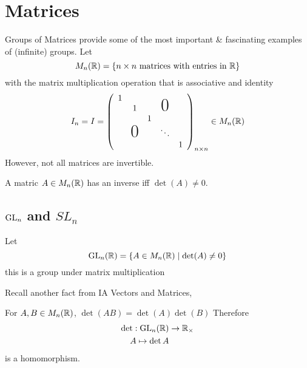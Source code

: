 \documentclass{article}
\begin{document}
\section{Matrices}

Groups of Matrices provide some of the most important \& fascinating examples of (infinite) groups.
Let
\[
    M_n(\mathbb{R}) = \{ n \times n \text{ matrices with entries in } \mathbb{R}\}
\]
with the matrix multiplication operation that is associative and identity
\[
    I_n = I = \bkt{
        \begin{array}{ccccc}
            1                                                    \\
              & 1                     &  & \smash{\text{\huge0}} \\
              &                       & 1                        \\
              & \smash{\text{\huge0}} &   & \ddots               \\
              &                       &   &   & 1
        \end{array}
    }_{n \times n} \in M_n(\R)
\]
However, not all matrices are invertible.
\begin{lemma}
    A matric $A \in M_n(\mathbb{R})$ has an inverse iff $\det(A) \neq 0$.
\end{lemma}
\subsection{$\mathrm{GL}_n$ and $SL_n$}
\begin{defi}
    Let
    \[
        \mathrm{GL}_n(\mathbb{R}) = \{A \in M_n(\mathbb{R}) \mid \det(A) \neq 0\}  
    \]
    this is a group under matrix multiplication
\end{defi}

Recall another fact from IA Vectors and Matrices, 
\begin{lemma}
    For $A, B \in M_n(\mathbb{R})$, $\det(AB) = \det(A)\det(B)$
    Therefore
    \begin{align*}
        \det: \mathrm{GL}_n(\mathbb{R}) &\rightarrow \mathbb{R}_\times \\
        A \mapsto \det A
    \end{align*}
    is a homomorphism.
\end{lemma}
\end{document}
